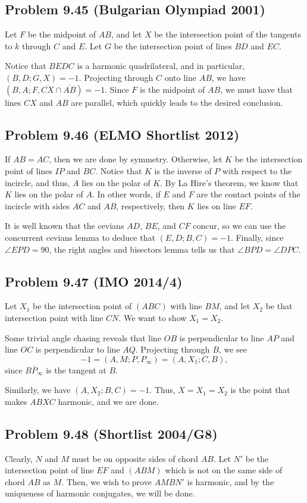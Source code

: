 \documentclass{scrartcl}
\begin{document}
\subsection*{Problem 9.45 (Bulgarian Olympiad 2001)}
Let $F$ be the midpoint of $AB$, and let $X$ be the intersection point of the tangents to $k$ through $C$ and $E$.
Let $G$ be the intersection point of lines $BD$ and $EC$.

Notice that $BEDC$ is a harmonic quadrilateral, and in particular, $(B,D;G,X)=-1$. Projecting through $C$ onto
line $AB$, we have $(B,A;F,\overline{CX}\cap\overline{AB})=-1$. Since $F$ is the midpoint of $AB$, we must have
that lines $CX$ and $AB$ are parallel, which quickly leads to the desired conclusion.
\subsection*{Problem 9.46 (ELMO Shortlist 2012)}
If $AB = AC$, then we are done by symmetry. Otherwise, let $K$ be the intersection point of lines $IP$ and $BC$.
Notice that $K$ is the inverse of $P$ with respect to the incircle, and thus, $A$ lies on the polar of $K$.
By La Hire's theorem, we know that $K$ lies on the polar of $A$. In other words, if $E$ and $F$ are the contact
points of the incircle with sides $AC$ and $AB$, respectively, then $K$ lies on line $EF$.

It is well known that the cevians $AD$, $BE$, and $CF$ concur, so we can use the concurrent cevians lemma to deduce
that $(E,D;B,C) = -1$. Finally, since $\angle EPD = 90$, the right angles and bisectors lemma tells us that
$\angle BPD = \angle DPC$.

\subsection*{Problem 9.47 (IMO 2014/4)}
Let $X_1$ be the intersection point of $(ABC)$ with line $BM$, and let $X_2$ be that intersection point with line
$CN$. We want to show $X_1 = X_2$.

Some trivial angle chasing reveals that line $OB$ is perpendicular to line $AP$ and line $OC$ is perpendicular to
line $AQ$.
Projecting through $B$, we see
\[ -1 = (A,M;P,P_\infty) = (A,X_1;C,B),\]
since $\overline{BP_\infty}$ is the tangent at $B$.

Similarly, we have $(A,X_2;B,C) = -1$. Thus, $X = X_1 = X_2$ is the point that makes $ABXC$ harmonic, and we are
done.
\subsection*{Problem 9.48 (Shortlist 2004/G8)}
Clearly, $N$ and $M$ must be on opposite sides of chord $AB$. Let $N'$ be the intersection point of line $EF$ and
$(ABM)$ which is not on the same side of chord $AB$ as $M$. Then, we wish to prove $AMBN'$ is harmonic, and by
the uniqueness of harmonic conjugates, we will be done.
\end{document}
